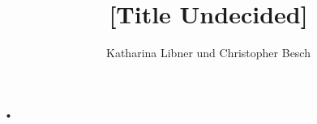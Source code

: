 \documentclass[10pt,a4paper]{article}
\author{Katharina Libner und Christopher Besch}
\title{[Title Undecided]}
\begin{document}
\maketitle
\tableofcontents
\newpage

•
\end{document}
